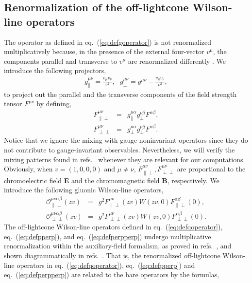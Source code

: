 \subsection{Renormalization of the off-lightcone Wilson-line operators}
The operator as defined in eq.~(\ref{eq:defgoperator}) is not renormalized multiplicatively because, in the presence of the external four-vector $v^{\mu}$,  the components parallel and transverse to $v^{\mu}$ are renormalized differently \cite{Braun:2020ymy}. We introduce the following projectors,
\begin{eqnarray}
g^{\mu\nu}_{\|} = \frac{v_{\mu}v_{\nu}}{v^2},\, \, \, \, g^{\mu\nu}_{\perp} = g^{\mu\nu} - \frac{v_{\mu}v_{\nu}}{v^2},
\end{eqnarray}
to project out the parallel and the transverse components of the field strength tensor $F^{\mu\nu}$ by defining,
\begin{eqnarray}
F^{\mu\nu}_{\|\perp} &=& g^{\mu\alpha}_{\|}g^{\nu\beta}_{\perp}F^{\alpha\beta},\\
F^{\mu\nu}_{\perp\perp} &=& g^{\mu\alpha}_{\perp}g^{\nu\beta}_{\perp}F^{\alpha\beta}.
\end{eqnarray}
Notice that we ignore the mixing with gauge-noninvariant operators since they do not contribute to gauge-invariant observables. Nevertheless, we will verify the mixing patterns found in refs.~\cite{Dorn:1981wa,Zhang:2018diq,Wang:2019tgg} whenever they are relevant for our computations.
Obviously, when $v=(1,0,0,0)$ and $\mu\neq\nu$, $F^{\mu\nu}_{\|\perp}, F^{\mu\nu}_{\perp\perp}$ are proportional to the chromoelectric field \textbf{E} and the chromomagnetic field \textbf{B}, respectively. We introduce the following gluonic Wilson-line operators,
\begin{eqnarray}
\label{eq:defpperp}
\mathcal{O}_{\|\perp}^{\mu\nu\alpha\beta} (zv)&=& g^2 F_{\|\perp}^{\mu\nu}(zv)W(zv,0)F_{\|\perp}^{\alpha\beta}(0),\\
\label{eq:defperpperp}
\mathcal{O}_{\perp\perp}^{\mu\nu\alpha\beta} (zv)&=& g^2 F_{\perp\perp}^{\mu\nu}(zv)W(zv,0)F_{\perp\perp}^{\alpha\beta}(0).
\end{eqnarray}
The off-lightcone Wilson-line operators defined in eq.~(\ref{eq:defqoperator}), eq.~(\ref{eq:defpperp}), and eq.~(\ref{eq:defperpperp})  undergo multiplicative renormalization within the auxiliary-field formalism, as proved in refs.~\cite{Green:2017xeu, Ji:2017oey, Zhang:2018diq}, and shown diagrammatically in refs.~\cite{Ishikawa:2017faj, Li:2018tpe}. That is, the renormalized off-lightcone Wilson-line operators in eq.~(\ref{eq:defqoperator}), eq.~(\ref{eq:defpperp}) and eq.~(\ref{eq:defperpperp}) are related to the bare operators by the formulas,

